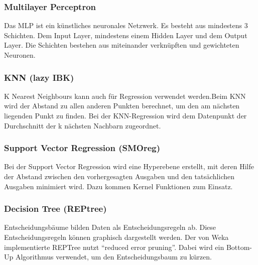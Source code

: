 \documentclass[letterpaper]{article} %
\begin{document}
    \subsubsection*{Multilayer Perceptron}
        Das MLP ist ein künstliches neuronales Netzwerk. Es besteht aus mindestens 3 Schichten. Dem Input Layer, mindestens einem Hidden Layer und dem Output Layer. Die Schichten bestehen aus miteinander verknüpften und gewichteten Neuronen. 
    
    \subsubsection*{KNN (lazy IBK)}
        K Nearest Neighbours kann auch für Regression verwendet werden.Beim KNN wird der Abstand zu allen anderen Punkten berechnet, um den am nächsten liegenden Punkt zu finden. Bei der KNN-Regression wird dem Datenpunkt der Durchschnitt der k nächsten Nachbarn zugeordnet.
    
    \subsubsection*{Support Vector Regression (SMOreg)}
        Bei der Support Vector Regression wird eine Hyperebene erstellt, mit deren Hilfe der Abstand zwischen den vorhergesagten Ausgaben und den tatsächlichen Ausgaben minimiert wird. Dazu kommen Kernel Funktionen zum Einsatz.
    
    \subsubsection*{Decision Tree (REPtree)}
        Entscheidungsbäume bilden Daten als Entscheidungsregeln ab. Diese Entscheidungsregeln können graphisch dargestellt werden. Der von Weka implementierte REPTree nutzt “reduced error pruning”. Dabei wird ein Bottom-Up Algorithmus verwendet, um den Entscheidungsbaum zu kürzen.
    
\end{document}
